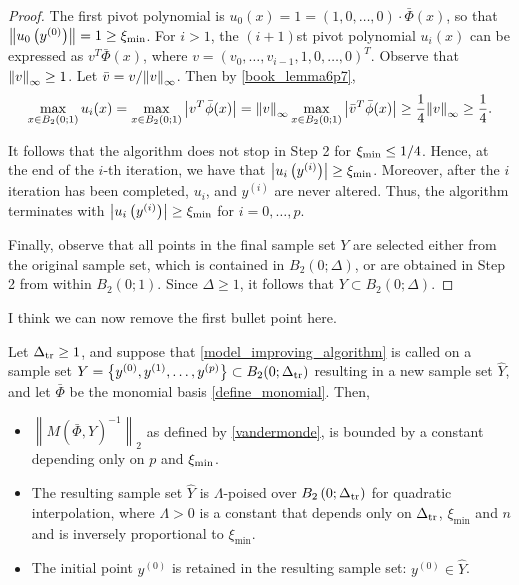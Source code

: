 \documentclass{article}
\begin{document}
\begin{proof}

The first pivot polynomial is $u_0(x) = 1 = (1, 0, \ldots, 0)\cdot \bar\Phi(x)$, so that $\left\|u_0\left(y^{(0)}\right)\right\| = 1 \ge \xi_{\text{min}}$.
For $i > 1$, the $(i+1)$st pivot polynomial $u_i(x)$ can be expressed as $v^T \bar{\Phi}(x)$,
where $v = (v_0, \ldots, v_{i-1},1,0,\ldots,0)^T$.
Observe that ${\left\|v\right\|}_{\infty} \ge 1$.
Let $\bar{v} = v/{\left\|v\right\|}_{\infty}$.
Then by \cref{book_lemma6p7},
\[ \max_{x \in B_2(0;1)} u_i(x) = \max_{x \in B_2(0;1)} \left| v^T \bar{\phi}(x)\right| =
{\left\|v\right\|}_{\infty} \max_{x \in B_2(0;1)}  \left|\bar{v}^T \bar{\phi}(x)\right| \ge \frac{1}{4} {\left\|v\right\|}_{\infty} \ge \frac{1}{4}.\]

It follows that the algorithm does not stop in Step 2 for $\xi_{\text{min}} \le 1/4$.   Hence, at the end of the $i$-th iteration, we have that  $\left| u_i\left(y^{(i)}\right)\right| \ge \xi_{\text{min}}$.  Moreover,  after the $i$ iteration has been completed,  $u_i$,  and $y^{(i)}$ are never altered.  Thus, the algorithm terminates with  $\left| u_i\left(y^{(i)}\right)\right| \ge \xi_{\text{min}}$ for $i=0, \ldots, p$.

Finally,  observe that all points in the final sample set $Y$ are selected either from the original sample set, which is contained in $B_2(0;\Delta)$,  or are obtained in Step 2 from within $B_2(0;1)$.  Since $\Delta  \ge 1$, it follows that $Y \subset B_2(0;\Delta)$.

\end{proof}


\color{magenta}
I think we can now remove the first bullet point here.
\color{black}

\begin{theorem}
\label{set_is_poised}

Let $\Delta_{\textrm{tr}} \ge 1$, and suppose that \cref{model_improving_algorithm} is called on a sample set
$Y = \left\{y^{(0)}, y^{(1)}, \ldots, y^{(p)}\right\} \subset B_2(0; \Delta_{\textrm{tr}})$
resulting in a new sample set $\hat Y$,
and let $\bar{\Phi}$ be the monomial basis \cref{define_monomial}.
Then,
\begin{itemize}
\item $\left\|M(\bar \Phi, \hat Y)^{-1}\right\|_2$ as defined by \cref{vandermonde}, is bounded by a constant depending only on $p$ and $\xi_{\text{min}}$.
\item The resulting sample set $\hat Y$ is $\Lambda$-poised over $B_2\left(0;\Delta_{\textrm{tr}} \right)$ for quadratic interpolation,
where $\Lambda > 0$ is a constant that depends only on $\Delta_{\textrm{tr}}$, $\xi_{\text{min}}$ and $n$ and is inversely proportional to $\xi_{\text{min}}$.
\item The initial point $y^{(0)}$ is retained in the resulting sample set: $y^{(0)} \in \hat Y$.
\end{itemize}
\end{theorem}
\end{document}
